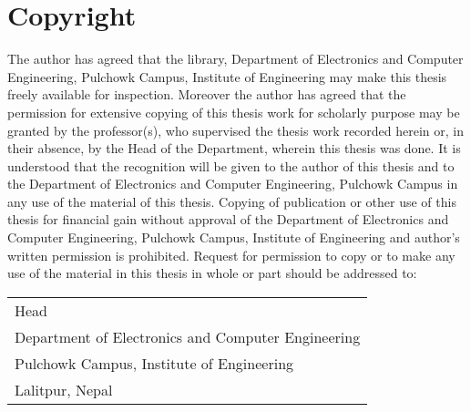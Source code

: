 \chapter*{Copyright}
\doublespacing

The author has agreed that the library, Department of Electronics and Computer Engineering, Pulchowk Campus, Institute of Engineering may make this thesis freely available for inspection. Moreover the author has agreed that the permission for extensive copying of this thesis work for scholarly purpose may be granted by the professor(s), who supervised the thesis work recorded herein or, in their absence, by the Head of the Department, wherein this thesis was done. It is understood that the recognition will be given to the author of this thesis and to the Department of Electronics and Computer Engineering, Pulchowk Campus in any use of the material of this thesis. Copying of publication or other use of this thesis for financial gain without approval of the Department of Electronics and Computer Engineering, Pulchowk Campus, Institute of Engineering and author’s written permission is prohibited. Request for permission to copy or to make any use of the material in this thesis in whole or part should be addressed to:

{\vspace{1cm}}
\begin{tabular}{l}
Head \\
Department of Electronics and Computer Engineering \\
Pulchowk Campus, Institute of Engineering \\
Lalitpur, Nepal\\

\end{tabular}

\iffalse
Head

Department of Electronics and Computer Engineering

Institute of Engineering, Pulchowk Campus

Lalitpur, Nepal

\fi
